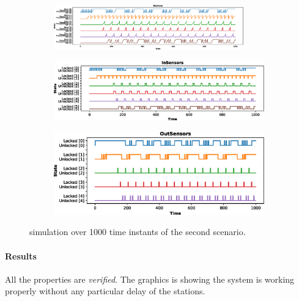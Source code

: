 \documentclass[a4paper,twoside]{article}
\begin{document}
    \begin{figure}[h!]
        \begin{subfigure}{\textwidth}
            \centering
            \includegraphics[width=0.9\textwidth]{images/scenarios/scenario2_stations}
        \end{subfigure}
        \begin{subfigure}{0.49\textwidth}
            \centering
            \includegraphics[width=\textwidth]{images/scenarios/scenario2_insensors}
        \end{subfigure}
        \hfill
        \begin{subfigure}{0.49\textwidth}
            \centering
            \includegraphics[width=\textwidth]{images/scenarios/scenario2_outsensors}
        \end{subfigure}
        \caption{simulation over 1000 time instants of the second scenario.}
        \label{figure:scenario:2}
    \end{figure}

    \paragraph{Results} All the properties are \textit{verified}. The graphics is showing the system is working properly without any particular delay of the stations.
\end{document}
